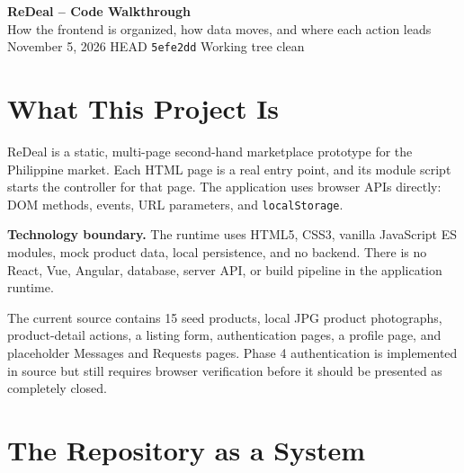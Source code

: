 \documentclass[10pt]{article}
\newcommand{\code}[1]{\texttt{#1}}
\begin{document}
\begin{center}
{\Huge\bfseries\color{violet} ReDeal -- Code Walkthrough}\\[3pt]
{\large\color{secondary} How the frontend is organized, how data moves, and where each action leads}\\[8pt]
{\small November 5, 2026 \quad\textbullet\quad HEAD \code{5efe2dd} \quad\textbullet\quad Working tree clean}
\end{center}

\section{What This Project Is}

ReDeal is a static, multi-page second-hand marketplace prototype for the Philippine market. Each HTML page is a real entry point, and its module script starts the controller for that page. The application uses browser APIs directly: DOM methods, events, URL parameters, and \code{localStorage}.

\begin{infobox}
\textbf{Technology boundary.} The runtime uses HTML5, CSS3, vanilla JavaScript ES modules, mock product data, local persistence, and no backend. There is no React, Vue, Angular, database, server API, or build pipeline in the application runtime.
\end{infobox}

The current source contains 15 seed products, local JPG product photographs, product-detail actions, a listing form, authentication pages, a profile page, and placeholder Messages and Requests pages. Phase 4 authentication is implemented in source but still requires browser verification before it should be presented as completely closed.

\section{The Repository as a System}
\end{document}
